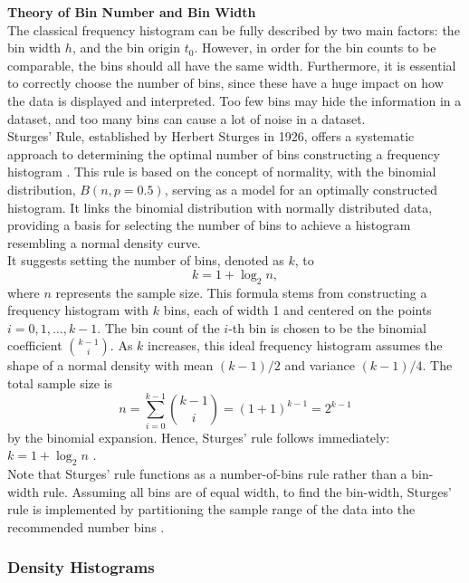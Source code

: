 \documentclass{article}\usepackage[]{graphicx}\usepackage[]{xcolor}
\numberwithin{equation}{section}
\begin{document}
\noindent \textbf{Theory of Bin Number and Bin Width}\\
\noindent The classical frequency histogram can be fully described by two main factors: the bin width $h$, and the bin origin $t_{0}$. However, in order for the bin counts to be comparable, the bins should all have the same width. Furthermore, it is essential to correctly choose the number of bins, since these have a huge impact on how the data is displayed and interpreted. Too few bins may hide the information in a dataset, and too many bins can cause a lot of noise in a dataset.\\

\noindent Sturges' Rule, established by Herbert Sturges in 1926, offers a systematic approach to determining the optimal number of bins constructing a frequency histogram \cite{scott2015multivariate}. This rule is based on the concept of normality, with the binomial distribution, $B(n,p = 0.5)$, serving as a model for an optimally constructed histogram. It links the binomial distribution with normally distributed data, providing a basis for selecting the number of bins to achieve a histogram resembling a normal density curve.\\

\noindent It suggests setting the number of bins, denoted as $k$, to \[ k = 1 + \log_{2} n, \] where $n$ represents the sample size. This formula stems from constructing a frequency histogram with $k$ bins, each of width 1 and centered on the points $i = 0,1,\dots, k - 1$. The bin count of the $i$-th bin is chosen to be the binomial coefficient $\binom{k-1}{i}$. As $k$ increases, this ideal frequency histogram assumes the shape of a normal density with mean $(k - 1)/2$ and variance $(k - 1)/4$. The total sample size is
\[ n = \sum_{i=0}^{k-1} \binom{k-1}{i} = (1+1)^{k-1} = 2^{k-1} \]
by the binomial expansion. Hence, Sturges’ rule follows immediately: $k = 1 + \log_2 n$ \cite{scott2015multivariate}.\\

\noindent Note that Sturges’ rule functions as a number-of-bins rule rather than a bin-width rule. Assuming all bins are of equal width, to find the bin-width, Sturges’ rule is implemented by partitioning the sample range of the data into the recommended number bins \cite{scott2015multivariate}.

\subsubsection{Density Histograms}
\end{document}
